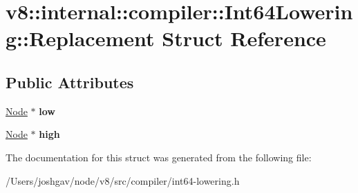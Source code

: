 \hypertarget{structv8_1_1internal_1_1compiler_1_1_int64_lowering_1_1_replacement}{}\section{v8\+:\+:internal\+:\+:compiler\+:\+:Int64\+Lowering\+:\+:Replacement Struct Reference}
\label{structv8_1_1internal_1_1compiler_1_1_int64_lowering_1_1_replacement}
\subsection*{Public Attributes}
\begin{DoxyCompactItemize}
\item 
\hyperlink{classv8_1_1internal_1_1compiler_1_1_node}{Node} $\ast$ {\bfseries low}\hypertarget{structv8_1_1internal_1_1compiler_1_1_int64_lowering_1_1_replacement_ac5f9f3af6b844f3da9c0d588d964403b}{}\label{structv8_1_1internal_1_1compiler_1_1_int64_lowering_1_1_replacement_ac5f9f3af6b844f3da9c0d588d964403b}

\item 
\hyperlink{classv8_1_1internal_1_1compiler_1_1_node}{Node} $\ast$ {\bfseries high}\hypertarget{structv8_1_1internal_1_1compiler_1_1_int64_lowering_1_1_replacement_a24b17bf1c9ca1e85b6df036302e644da}{}\label{structv8_1_1internal_1_1compiler_1_1_int64_lowering_1_1_replacement_a24b17bf1c9ca1e85b6df036302e644da}

\end{DoxyCompactItemize}


The documentation for this struct was generated from the following file\+:\begin{DoxyCompactItemize}
\item 
/\+Users/joshgav/node/v8/src/compiler/int64-\/lowering.\+h\end{DoxyCompactItemize}
